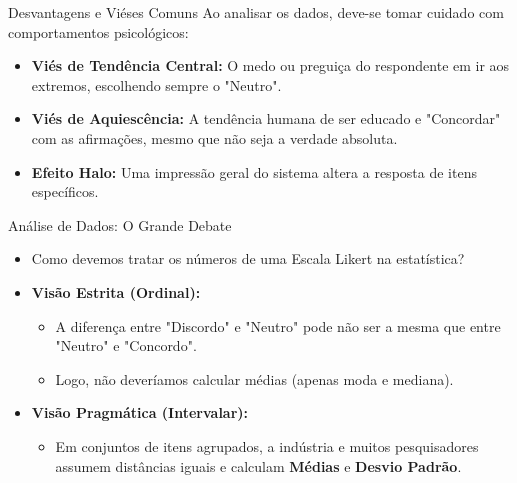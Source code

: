 \documentclass[aspectratio=169]{beamer}
\begin{document}
\begin{frame}{Desvantagens e Viéses Comuns}
    Ao analisar os dados, deve-se tomar cuidado com comportamentos psicológicos:
    \vspace{0.4cm}
    \begin{itemize}
        \item \textbf{Viés de Tendência Central:} O medo ou preguiça do respondente em ir aos extremos, escolhendo sempre o "Neutro".
        \item \textbf{Viés de Aquiescência:} A tendência humana de ser educado e "Concordar" com as afirmações, mesmo que não seja a verdade absoluta.
        \item \textbf{Efeito Halo:} Uma impressão geral do sistema altera a resposta de itens específicos.
    \end{itemize}
\end{frame}

\begin{frame}{Análise de Dados: O Grande Debate}
    \begin{itemize}
        \item Como devemos tratar os números de uma Escala Likert na estatística?
        \vspace{0.3cm}
        \item \textbf{Visão Estrita (Ordinal):}
        \begin{itemize}
            \item A diferença entre "Discordo" e "Neutro" pode não ser a mesma que entre "Neutro" e "Concordo".
            \item Logo, não deveríamos calcular médias (apenas moda e mediana).
        \end{itemize}
        \vspace{0.2cm}
        \item \textbf{Visão Pragmática (Intervalar):}
        \begin{itemize}
            \item Em conjuntos de itens agrupados, a indústria e muitos pesquisadores assumem distâncias iguais e calculam \textbf{Médias} e \textbf{Desvio Padrão}.
        \end{itemize}
    \end{itemize}
\end{frame}
\end{document}
